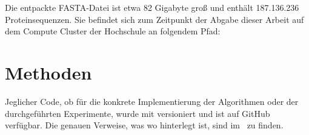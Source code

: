         \href{https://ftp.uniprot.org/pub/databases/uniprot/previous_releases/release-2024_02/}{}

        Die entpackte FASTA-Datei ist etwa 82 Gigabyte groß und enthält 187.136.236 Proteinsequenzen. Sie befindet sich zum Zeitpunkt der Abgabe dieser Arbeit auf dem Compute Cluster der Hochschule an folgendem Pfad:


\section{Methoden} %
    \label{sec:methoden}
    Jeglicher Code, ob für die konkrete Implementierung der Algorithmen oder der durchgeführten Experimente, wurde mit versioniert und ist auf GitHub verfügbar. Die genauen Verweise, was wo hinterlegt ist, sind im \Anhang\ zu finden.

